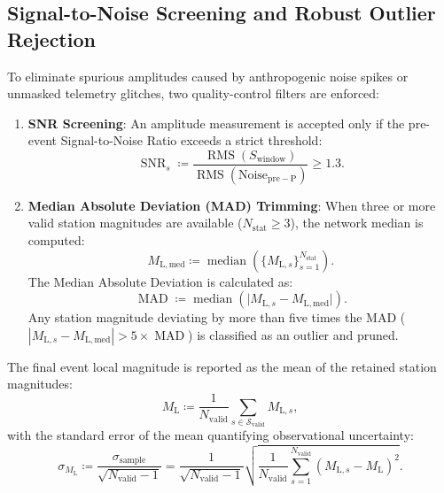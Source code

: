 \subsection{Signal-to-Noise Screening and Robust Outlier Rejection}
To eliminate spurious amplitudes caused by anthropogenic noise
spikes or unmasked telemetry glitches, two quality-control filters
are enforced:
\begin{enumerate}
  \item \textbf{\acs{SNR} Screening}: An amplitude measurement is accepted
    only if the pre-event Signal-to-Noise Ratio exceeds a strict threshold:
    \begin{equation}
      \operatorname{SNR}_s \coloneqq
      \frac{\operatorname{RMS}(S_{\mathrm{window}})}{\operatorname{RMS}(\mathrm{Noise}_{\mathrm{pre-P}})}
      \ge \num{1.3}.
    \end{equation}
  \item \textbf{Median Absolute Deviation (MAD) Trimming}: When
    three or more valid station magnitudes are available
    ($N_{\mathrm{stat}} \ge \num{3}$), the network median is computed:
    \begin{equation}
      M_{\mathrm{L}, \mathrm{med}} \coloneqq
      \operatorname{median}\left(\{M_{\mathrm{L},
      s}\}_{s = 1}^{N_{\mathrm{stat}}}\right).
    \end{equation}
    The Median Absolute Deviation is calculated as:
    \begin{equation}
      \operatorname{MAD} \coloneqq \operatorname{median}\left( \Big|
        M_{\mathrm{L}, s} -
        M_{\mathrm{L},
      \mathrm{med}} \Big| \right).
    \end{equation}
    Any station magnitude deviating by more than five times the MAD
    ($|M_{\mathrm{L}, s} - M_{\mathrm{L}, \mathrm{med}}| > \num{5} \times
    \operatorname{MAD}$) is
    classified as an outlier and pruned.
\end{enumerate}

The final event local magnitude is reported as the mean of the
retained station magnitudes:
\begin{equation}
  M_{\mathrm{L}} \coloneqq \frac{1}{N_{\mathrm{valid}}} \sum_{s \in
  \mathcal{S}_{\mathrm{valid}}} M_{\mathrm{L}, s},
  \label{eq:network_magnitude}
\end{equation}
with the standard error of the mean quantifying observational uncertainty:
\begin{equation}
  \sigma_{M_{\mathrm{L}}} \coloneqq
  \frac{\sigma_{\mathrm{sample}}}{\sqrt{N_{\mathrm{valid}} - 1}} =
  \frac{1}{\sqrt{N_{\mathrm{valid}} - 1}}
  \sqrt{\frac{1}{N_{\mathrm{valid}}} \sum_{s = 1}^{N_{\mathrm{valid}}}
  \left(M_{\mathrm{L}, s} - M_{\mathrm{L}}\right)^2}.
\end{equation}

